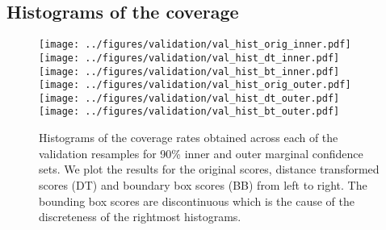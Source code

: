 \subsection{Histograms of the coverage}
\begin{figure}[h!]
	\begin{center}
		\texttt{[image: ../figures/validation/val\_hist\_orig\_inner.pdf]}
		\texttt{[image: ../figures/validation/val\_hist\_dt\_inner.pdf]}
		\texttt{[image: ../figures/validation/val\_hist\_bt\_inner.pdf]}\\
		\texttt{[image: ../figures/validation/val\_hist\_orig\_outer.pdf]}
		\texttt{[image: ../figures/validation/val\_hist\_dt\_outer.pdf]}
		\texttt{[image: ../figures/validation/val\_hist\_bt\_outer.pdf]}
	\end{center}
	\caption{Histograms of the coverage rates obtained across each of the validation resamples for 90\% inner and outer marginal confidence sets. We plot the results for the original scores, distance transformed scores (DT) and boundary box scores (BB) from left to right. The bounding box scores are discontinuous which is the cause of the discreteness of the rightmost histograms.}\label{fig:valhist}
\end{figure}

